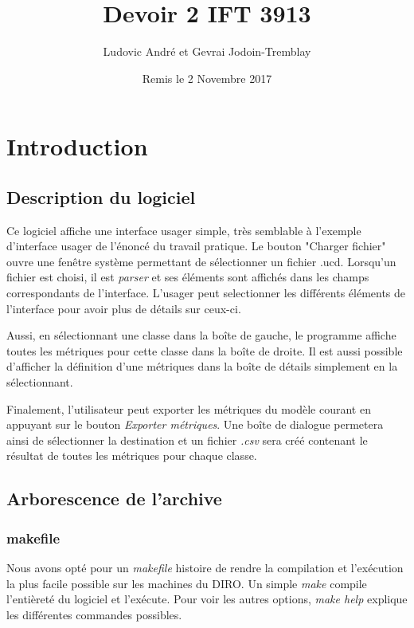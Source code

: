 \documentclass[letter,french]{report}
\begin{document}
	\title{Devoir 2 IFT 3913}
	\author{Ludovic André et Gevrai Jodoin-Tremblay}
	\date{Remis le 2 Novembre 2017}
	\maketitle
	
	
  \section*{Introduction}

	\subsection*{Description du logiciel}
	Ce logiciel affiche une interface usager simple, très semblable
	à l'exemple d'interface usager de l'énoncé du travail pratique. Le bouton "Charger
	fichier" ouvre une fenêtre système permettant de sélectionner un fichier .ucd.
	Lorsqu'un fichier est choisi, il est \emph{parser} et ses éléments sont affichés dans
	les champs correspondants de l'interface. L'usager peut selectionner les
  différents éléments de l'interface pour avoir plus de détails sur ceux-ci.

  Aussi, en sélectionnant une classe dans la boîte de gauche, le programme
  affiche toutes les métriques pour cette classe dans la boîte de droite. Il est
  aussi possible d'afficher la définition d'une métriques dans la boîte de
  détails simplement en la sélectionnant.

  Finalement, l'utilisateur peut exporter les métriques du modèle courant en
  appuyant sur le bouton \emph{Exporter métriques}. Une boîte de dialogue
  permetera ainsi de sélectionner la destination et un fichier \emph{.csv} sera
  créé contenant le résultat de toutes les métriques pour chaque classe.

  \subsection*{Arborescence de l'archive}
	\subsubsection*{makefile}
	Nous avons opté pour un \emph{makefile} histoire de rendre la compilation et l'exécution
	la plus facile possible sur les machines du DIRO. Un simple \emph{make} compile
	l'entièreté du logiciel et l'exécute. Pour voir les autres options, \emph{make help}
	explique les différentes commandes possibles.
\end{document}
